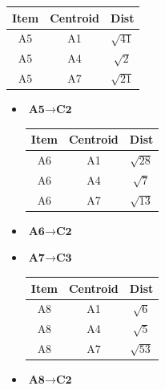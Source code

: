\documentclass[aspectratio=169, 10pt]{beamer}
\begin{document}
\begin{frame}[t]
\begin{columns}[]
\begin{column}{0.5\textwidth}
            \begin{table}[]
                \scriptsize
                \begin{tabular}{ccc}
                Item & Centroid & Dist \\ \hline
                A5   & A1       & $\sqrt{41}$ \\
                A5   & A4       & $\sqrt{2}$ \\
                A5   & A7       & $\sqrt{21}$
                \end{tabular}
            \end{table}
            \begin{itemize}
                \item $\textbf{A5} \rightarrow \textbf{C2}$
                \begin{table}[]
                    \scriptsize
                    \begin{tabular}{ccc}
                    Item & Centroid & Dist \\ \hline
                    A6   & A1       & $\sqrt{28}$ \\
                    A6   & A4       & $\sqrt{7}$ \\
                    A6   & A7       & $\sqrt{13}$
                    \end{tabular}
                \end{table}
                \item $\textbf{A6} \rightarrow \textbf{C2}$
                \item $\textbf{A7} \rightarrow \textbf{C3}$
                \begin{table}[]
                    \scriptsize
                    \begin{tabular}{ccc}
                    Item & Centroid & Dist \\ \hline
                    A8   & A1       & $\sqrt{6}$ \\
                    A8   & A4       & $\sqrt{5}$ \\
                    A8   & A7       & $\sqrt{53}$
                    \end{tabular}
                \end{table}
                \item $\textbf{A8} \rightarrow \textbf{C2}$
            \end{itemize}
        \end{column}
    \end{columns}

\end{frame}
\end{document}
